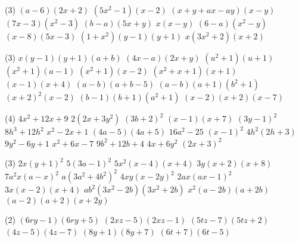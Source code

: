 \documentclass[a4paper,12pt]{report}
\begin{document}
\vspace*{-2\baselineskip}
\begin{core}
	\phantom{}
	\begin{tasks}(3)
		\task $(a-6)(2x+2)$
		\task $(5x^2-1)(x-2)$
		\task $(x+y+ax-ay)(x-y)$
		\task $(7x-3)(x^2-3)$
		\task $(b-a)(5x+y)$
		\task $x(x-y)$
		\task $(6-a)(x^2-y)$
		\task $(x-8)(5x-3)$
		\task $(1+x^2)(y-1)(y+1)$
		\task $x(3x^2+2)(x+2)$
	\end{tasks}
\end{core}
\begin{core}
	\phantom{}
\begin{tasks}(3)
	\task $x(y-1)(y+1)(a+b)$
	\task $(4x-a)(2x+y)$
	\task $(u^2+1)(u+1)$
	\task $(x^2+1)(a-1)$
	\task $(x^2+1)(x-2)$
	\task $(x^2+x+1)(x+1)$
	\task $(x-1)(x+4)$
	\task $(a-b)(a+b-5)$
	\task $(a-b)(a+1)(b^2+1)$
	\task $(x+2)^2(x-2)$
	\task $(b-1)(b+1)(a^2+1)$
	\task $(x-2)(x+2)(x-7)$
\end{tasks}
\end{core}
\begin{core}
	\phantom{}
	\begin{tasks}(4)
		\task $4x^2+12x+9$
		\task $2(2x+3y^2)$
		\task $(3b+2)^2$
		\task $(x-1)(x+7)$
		\task $(3y-1)^2$
		\task $8h^3+12h^2$
		\task $x^2-2x+1$
		\task $(4a-5)(4a+5)$
		\task $16a^2-25$
		\task $(x-1)^2$
		\task $4h^2(2h+3)$
		\task $9y^2-6y+1$
		\task $x^2+6x-7$
		\task $9b^2+12b+4$
		\task $4x+6y^2$
		\task $(2x+3)^2$
	\end{tasks}
\end{core}
\begin{core}
	\phantom{}
\begin{tasks}(3)
	\task $2x(y+1)^2$
		\task $5(3a-1)^2$
		\task $5x^2(x-4)(x+4)$
		\task $3y(x+2)(x+8)$
		\task $7a^2x(a-x)^2$
		\task $a(3a^2+4b^2)^2$
		\task $4xy(x-2y)^2$
		\task $2ax(ax-1)^2$
		\task $3x(x-2)(x+4)$
		\task $ab^2(3x^2-2b)(3x^2+2b)$
		\task $x^2(a-2b)(a+2b)$
		\task $(a-2)(a+2)(x+2y)$
\end{tasks}	
\end{core}

\begin{cora}\phantom{ }

\begin{tasks}(2)
\task ${{\left(6 r y-1\right)\left(6 r y+5 \right)}}$
\task ${{\left(2 x z-5 \right)\left(2 x z-1\right)}}$
\task ${{\left(5 t z-7 \right)\left(5 t z+2 \right)}}$
\task ${{\left(4 z-5 \right)\left(4 z-7 \right)}}$
\task ${{\left(8 y+1\right)\left(8 y+7 \right)}}$
\task ${{\left(6 t+7 \right)\left(6 t-5 \right)}}$
\end{tasks}

\end{cora}
\end{document}
